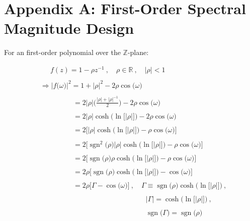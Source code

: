 \documentclass{article}
\DeclareMathOperator{\sgn}{sgn}
\begin{document}
\newpage
\section*{Appendix A: First-Order Spectral Magnitude Design}

For an first-order polynomial over the $\mathbb{Z}$-plane:

\begin{align*}
    & \quad \ \ f(z) = 1 - \rho z^{-1} \ , \quad \rho \in \mathbb{R} \ , \quad \big|\rho\big| < 1 \\ \\
    & \Rightarrow \Big|f\big(\omega\big)\Big|^{2} = 1 + \big|\rho\big|^{2} - 2\rho\cos\big(\omega\big) \\ \\
    & \quad \quad \quad \quad \ \ \ = 2\big|\rho\big|\Bigg(\frac{\big|\rho\big| + \big|\rho\big|^{-1}}{2}\Bigg) - 2\rho\cos\big(\omega\big) \\ \\
    & \quad \quad \quad \quad \ \ \ = 2\big|\rho\big|\cosh\Big(\ln\big[\big|\rho\big|\big]\Big) - 2\rho\cos\big(\omega\big) \\ \\
    & \quad \quad \quad \quad \ \ \ = 2\Bigg[\big|\rho\big|\cosh\Big(\ln\big[\big|\rho\big|\big]\Big) - \rho\cos\big(\omega\big)\Bigg] \\ \\
    & \quad \quad \quad \quad \ \ \ = 2\Bigg[\sgn^{2}\big(\rho\big)\big|\rho\big|\cosh\Big(\ln\big[\big|\rho\big|\big]\Big) - \rho\cos\big(\omega\big)\Bigg] \\ \\
    & \quad \quad \quad \quad \ \ \ = 2\Bigg[\sgn\big(\rho\big)\rho\cosh\Big(\ln\big[\big|\rho\big|\big]\Big) - \rho\cos\big(\omega\big)\Bigg] \\ \\
    & \quad \quad \quad \quad \ \ \ = 2\rho\Bigg[\sgn\big(\rho\big)\cosh\Big(\ln\big[\big|\rho\big|\big]\Big) - \cos\big(\omega\big)\Bigg] \\ \\
    & \quad \quad \quad \quad \ \ \ = 2\rho\bigg[\Gamma - \cos\big(\omega\big)\bigg] \ , \quad \Gamma \equiv \sgn\big(\rho\big)\cosh\Big(\ln\big[\big|\rho\big|\big]\Big) \ , \\ \\
    & \quad \quad \quad \quad \quad \quad \quad \quad \quad \quad \quad \quad \quad \quad \quad \big|\Gamma\big| = \cosh\Big(\ln\big[\big|\rho\big|\big]\Big) \ , \\ \\
    & \quad \quad \quad \quad \quad \quad \quad \quad \quad \quad \quad \quad \quad \quad \quad \sgn\big(\Gamma\big) = \sgn\big(\rho\big)
  \end{align*}\newline
\end{document}
